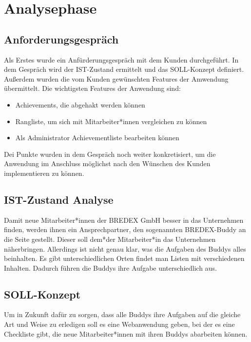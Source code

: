 \documentclass[12pt]{article}
\begin{document}
%
%

\section{Analysephase}

\subsection{Anforderungsgespräch}
Als Erstes wurde ein Anfürderungsgespräch mit dem Kunden durchgeführt.
In dem Gespräch wird der IST-Zustand ermittelt und das SOLL-Konzept definiert.
Außerdem wurden die vom Kunden gewünschten Features der Amwendung übermittelt.
Die wichtigsten Features der Anwendung sind:

\begin{itemize}
    \item Achievements, die abgehakt werden können
    \item Rangliste, um sich mit Mitarbeiter*innen vergleichen zu können
    \item Als Administrator Achievementliste bearbeiten können 
\end{itemize}

Dei Punkte wurden in dem Gespräch noch weiter konkretisiert, um die Anwendung
im Anschluss möglichst nach den Wünschen des Kunden implementieren zu können.


\subsection{IST-Zustand Analyse}

Damit neue Mitarbeiter*innen der BREDEX GmbH besser in das Unternehmen
finden, werden ihnen ein Ansprechpartner, den sogenannten BREDEX-Buddy
an die Seite gestellt. Dieser soll dem*der Mitarbeiter*in das Unternehmen
näherbringen. Allerdings ist nicht genau klar, was die Aufgaben des Buddys
alles beinhalten. Es gibt unterschiedlichen Orten findet man Listen mit
verschiedenen Inhalten. 
Dadurch führen die Buddys ihre Aufgabe unterschiedlich aus.


\subsection{SOLL-Konzept}

Um in Zukunft dafür zu sorgen, dass alle Buddys ihre Aufgaben auf die gleiche Art
und Weise zu erledigen soll es eine Webanwendung geben, bei der es eine Checkliste gibt,
die neue Mitarbeiter*innen mit ihren Buddys abarbeiten können.
\end{document}
